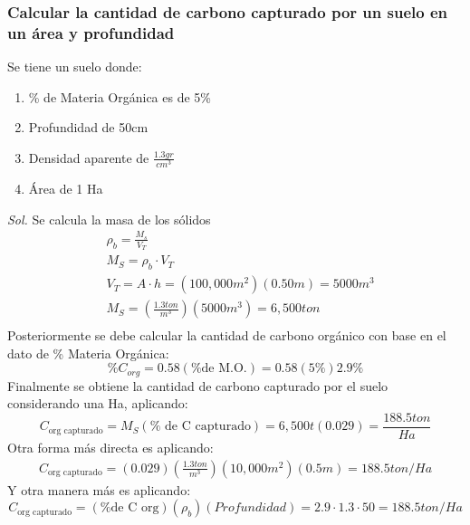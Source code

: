 \subsubsection{Calcular la cantidad de carbono capturado por un suelo en un área y profundidad}
\begin{example}
    Se tiene un suelo donde:
    \begin{enumerate}
        \item \% de Materia Orgánica es de 5\%
        \item Profundidad de 50cm
        \item Densidad aparente de $\frac{1.3gr}{cm^3}$
        \item Área de 1 Ha
    \end{enumerate}
\end{example}

\textit{ Sol. }
Se calcula la masa de los sólidos
\begin{align*}
    &\rho_b = \frac{M_s}{V_T}\\
    &M_S = \rho_b\cdot V_T\\
    &V_T = A\cdot h =\left(100,000m^2\right)\left(0.50m\right) = 5000m^3\\
    &M_S =\left(\frac{1.3ton}{m^3}\right)\left(5000m^3\right) = 6,500ton\\
\end{align*}
Posteriormente se debe calcular la cantidad de carbono orgánico con base en el dato de \% Materia Orgánica:
\begin{equation*}
    \%C_{org} =0.58\left(\%\text{de M.O.}\right)=0.58\left(5\%\right)2.9\%
\end{equation*}
Finalmente se obtiene la cantidad de carbono capturado por el suelo considerando una Ha, aplicando:
\begin{equation*}
C_{\text{org capturado}}=M_S\left(\%\text{ de C capturado}\right)=6,500t(0.029) = \frac{188.5ton}{Ha}
\end{equation*}
Otra forma más directa es aplicando:
\begin{align*}
    C_{\text{org capturado}}=\left(0.029\right)\left(\frac{1.3ton}{m^3}\right)\left(10,000m^2\right)\left(0.5m\right) = 188.5ton/Ha
\end{align*}
Y otra manera más es aplicando:
\begin{equation*}
    C_{\text{org capturado}}=\left(\% \text{de C org}\right)\left(\rho_b\right)\left(Profundidad\right) = 2.9 \cdot 1.3 \cdot 50 =188.5ton/Ha
\end{equation*}

